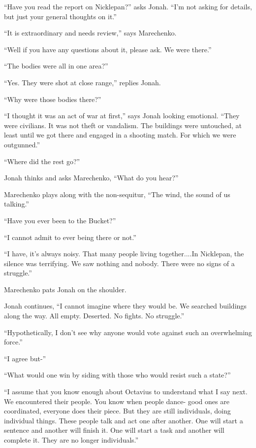 ``Have you read the report on Nicklepan?'' asks Jonah.  ``I'm not asking for details, but just your general thoughts on it.''

``It is extraordinary and needs review,'' says Marechenko.

``Well if you have any questions about it, please ask.  We were there.''

``The bodies were all in one area?''

``Yes. They were shot at close range,'' replies Jonah.

``Why were those bodies there?''

``I thought it was an act of war at first,'' says Jonah looking emotional.  ``They were civilians.  It was not theft or vandalism.  The buildings were untouched, at least until we got there and engaged in a shooting match.  For which we were outgunned.''

``Where did the rest go?''

Jonah thinks and asks Marechenko, ``What do you hear?''

Marechenko plays along with the non-sequitur, ``The wind, the sound of us talking.''

``Have you ever been to the Bucket?''

``I cannot admit to ever being there or not.''

``I have, it's always noisy.  That many people living together....In Nicklepan, the silence was terrifying.  We saw nothing and nobody.  There were no signs of a struggle.''

Marechenko pats Jonah on the shoulder.

Jonah continues, ``I cannot imagine where they would be.  We searched buildings along the way.  All empty.  Deserted.  No fights.  No struggle.''

``Hypothetically, I don't see why anyone would vote against such an overwhelming force.''

``I agree but-''

``What would one win by siding with those who would resist such a state?''

``I assume that you know enough about Octavius to understand what I say next.  We encountered their people.  You know when people dance- good ones are coordinated, everyone does their piece.  But they are still individuals, doing individual things.  These people talk and act one after another.  One will start a sentence and another will finish it.  One will start a task and another will complete it.  They are no longer individuals.''

